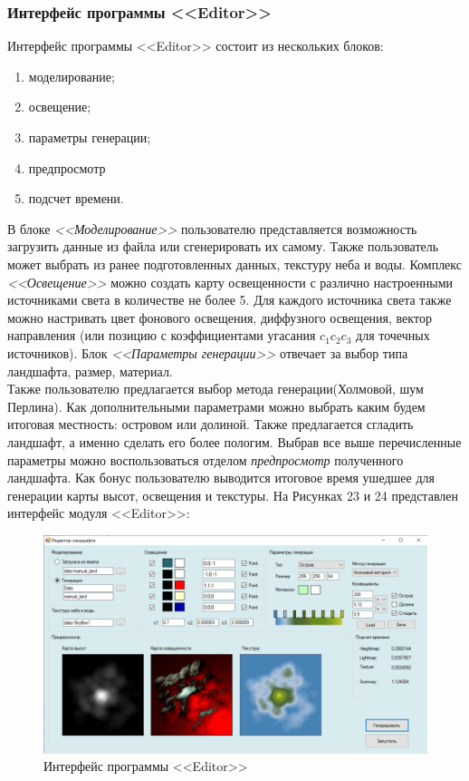 \documentclass[a4paper, 10pt]{article}
\begin{document}
	\subsubsection{Интерфейс программы <<Editor>>}
	Интерфейс программы <<Editor>> состоит из нескольких блоков:
	\begin{enumerate}
		\item моделирование;
		\item освещение;
		\item параметры генерации;
		\item предпросмотр
		\item подсчет времени.
	\end{enumerate}
	\hspace*{5mm} В блоке \textit{<<Моделирование>>} пользователю представляется возможность загрузить данные из файла или сгенерировать их самому. Также пользователь может выбрать из ранее подготовленных данных, текстуру неба и воды. Комплекс \textit{<<Освещение>>} можно создать карту освещенности с различно настроенными источниками света в количестве не более 5. Для каждого источника света также можно настривать цвет фонового освещения, диффузного освещения, вектор направления (или позицию с коэффициентами угасания $c_1 c_2 c_3$ для точечных источников). Блок \textit{<<Параметры генерации>>} отвечает за выбор типа ландшафта, размер, материал. \\ \hspace*{5mm} Также пользователю предлагается выбор метода генерации(Холмовой, шум Перлина). Как дополнительными параметрами можно выбрать каким будем итоговая местность: островом или долиной. Также предлагается сгладить ландшафт, а именно сделать его более пологим. Выбрав все выше перечисленные параметры можно воспользоваться отделом \textit{предпросмотр} полученного ландшафта. Как бонус пользователю выводится итоговое время ушедшее для генерации карты высот, освещения и текстуры. На Рисунках 23 и 24 представлен интерфейс модуля <<Editor>>:
	\clearpage
	\newpage
	\begin{figure}[t!]
		\centering
		\includegraphics[scale=0.6]{editor1}
		\centering\caption{Интерфейс программы <<Editor>>}
	\end{figure}
\end{document}
